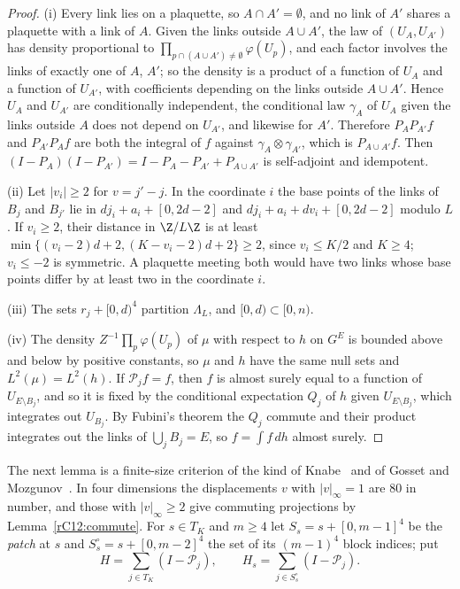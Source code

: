 \begin{proof}
(i) Every link lies on a plaquette, so $A\cap A'=\emptyset$, and no link of
$A'$ shares a plaquette with a link of $A$. Given the links outside $A\cup
A'$, the law of $(U_A,U_{A'})$ has density proportional to $\prod_{p\cap(A
\cup A')\ne\emptyset}\varphi(U_p)$, and each factor involves the links of
exactly one of $A$, $A'$; so the density is a product of a function of
$U_A$ and a function of $U_{A'}$, with coefficients depending on the links
outside $A\cup A'$. Hence $U_A$ and $U_{A'}$ are conditionally independent,
the conditional law $\gamma_A$ of $U_A$ given the links outside $A$ does not
depend on $U_{A'}$, and likewise for $A'$. Therefore $P_AP_{A'}f$ and
$P_{A'}P_Af$ are both the integral of $f$ against $\gamma_A\otimes
\gamma_{A'}$, which is $P_{A\cup A'}f$. Then $(I-P_A)(I-P_{A'})=I-P_A-P_{A'}+
P_{A\cup A'}$ is self-adjoint and idempotent.

(ii) Let $\lvert v_i\rvert\ge2$ for $v=j'-j$. In the coordinate $i$ the base
points of the links of $B_j$ and $B_{j'}$ lie in $dj_i+a_i+[0,2d-2]$ and
$dj_i+a_i+dv_i+[0,2d-2]$ modulo $L$. If $v_i\ge2$, their distance in $\Z/L\Z$
is at least $\min\{(v_i-2)d+2,(K-v_i-2)d+2\}\ge2$, since $v_i\le K/2$ and
$K\ge4$; $v_i\le-2$ is symmetric. A plaquette meeting both would have two
links whose base points differ by at least two in the coordinate $i$.

(iii) The sets $r_j+[0,d)^4$ partition $\Lambda_L$, and $[0,d)\subset[0,n)$.

(iv) The density $Z^{-1}\prod_p\varphi(U_p)$ of $\mu$ with respect to $h$ on
$G^E$ is bounded above and below by positive constants, so $\mu$ and $h$ have
the same null sets and $L^2(\mu)=L^2(h)$. If $\mathcal P_jf=f$, then $f$ is
almost surely equal to a function of $U_{E\setminus B_j}$, and so it is fixed
by the conditional expectation $Q_j$ of $h$ given $U_{E\setminus B_j}$, which
integrates out $U_{B_j}$. By Fubini's theorem the $Q_j$ commute and their
product integrates out the links of $\bigcup_jB_j=E$, so $f=\int f\,dh$
almost surely.
\end{proof}

The next lemma is a finite-size criterion of the kind of
Knabe~\cite{Kna88} and of Gosset and Mozgunov~\cite{GM16}. In four
dimensions the displacements $v$ with $\lvert v\rvert_\infty=1$ are $80$
in number, and those with $\lvert v\rvert_\infty\ge2$ give commuting
projections by Lemma~\ref{rC12:commute}. For $s\in T_K$ and $m\ge4$ let
$S_s=s+[0,m-1]^4$ be the \emph{patch} at $s$ and $S^\circ_s=s+[0,m-2]^4$
the set of its $(m-1)^4$ block indices; put
\[
H=\sum_{j\in T_K}(I-\mathcal P_j),\qquad H_s=\sum_{j\in S^\circ_s}(I-
\mathcal P_j).
\]

